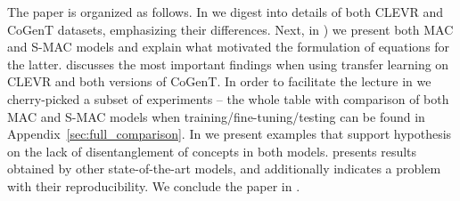 The paper is organized as follows.
In  we digest into details of both CLEVR and CoGenT datasets, emphasizing their differences.
Next, in ) we present both MAC and S-MAC models and explain what motivated the formulation of equations for the latter.
 discusses the most important findings when using transfer learning on CLEVR and both versions of CoGenT.
In order to facilitate the lecture in  we cherry-picked a subset of experiments -- the whole table with comparison of both MAC and S-MAC models when training/fine-tuning/testing can be found in Appendix~\ref{sec:full_comparison}.
In  we present examples that support hypothesis on the lack of disentanglement of concepts in both models.
 presents results obtained by other state-of-the-art models, and additionally indicates a problem with their reproducibility. 
We conclude the paper in .
